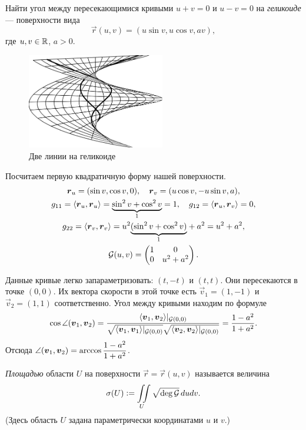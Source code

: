 \begin{problem}
	Найти угол между пересекающимися кривыми $u + v = 0$ и $u - v = 0$ на \textit{геликоиде} --- поверхности вида
	\[
		\vec{r}(u, v) = (u\sin v, u\cos v, av),
	\]
	где $u, v \in \mathbb{R}$, $a > 0$.
\end{problem}

\begin{figure}[H]
	\centering
	\includegraphics[width=6cm]{./img/HelicoidCurves.pdf}
	\caption{Две линии на геликоиде}
\end{figure}

\begin{solution}
	Посчитаем первую квадратичную форму нашей поверхности.
	\begin{gather*}
		\boldsymbol{r}_u = (\sin v, \cos v, 0),\quad \boldsymbol{r}_v = (u\cos v, -u\sin v, a),\\
		g_{11} = \langle\boldsymbol{r}_u, \boldsymbol{r}_u\rangle = {\underbrace{\sin^2v + \cos^2v}_{1}} = 1,\quad g_{12} = \langle\boldsymbol{r}_u, \boldsymbol{r}_v\rangle = 0,\\
		g_{22} = \langle\boldsymbol{r}_v, \boldsymbol{r}_v\rangle = u^2{\underbrace{(\sin^2v + \cos^2v)}_{1}} + a^2 = u^2 + a^2,\\
		\mathcal{G}(u, v) =
		\begin{pmatrix}
			1 & 0\\
			0 & u^2 + a^2
		\end{pmatrix}.
	\end{gather*}

	Данные кривые легко запараметризовать: $(t, -t)$ и $(t, t)$. Они пересекаются в точке $(0, 0)$. Их вектора скорости в этой точке есть $\vec{v}_1 = (1, -1)$ и $\vec{v}_2 = (1, 1)$ соответственно. Угол между кривыми находим по формуле
	\[
		\cos\angle(\boldsymbol{v}_1, \boldsymbol{v}_2) = \frac{\langle\boldsymbol{v}_1, \boldsymbol{v}_2\rangle|_{\mathcal{G}(0, 0)}}{\sqrt{\langle\boldsymbol{v}_1, \boldsymbol{v}_1\rangle|_{\mathcal{G}(0, 0)}}\sqrt{\langle\boldsymbol{v}_2, \boldsymbol{v}_2\rangle|_{\mathcal{G}(0, 0)}}} = \frac{1 - a^2}{1 + a^2}.
	\]
	Отсюда $\displaystyle\angle(\boldsymbol{v}_1, \boldsymbol{v}_2) = \arccos\frac{1 - a^2}{1 + a^2}$.
\end{solution}

\begin{definition}
	\textit{Площадью} области $U$ на поверхности $\vec{r} = \vec{r}(u, v)$ называется величина
	\[
		\sigma(U) \vcentcolon = \iint\limits_{U}\sqrt{\deg\mathcal{G}}\,dudv.
	\]
	(Здесь область $U$ задана параметрически координатами $u$ и $v$.)
\end{definition}

